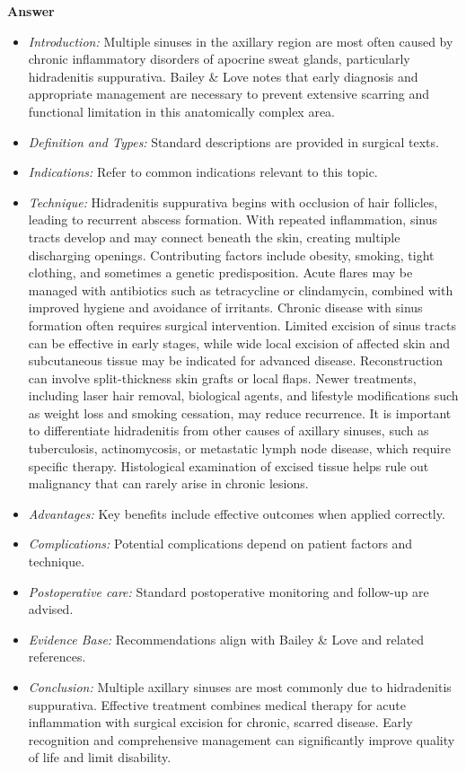 \documentclass{article}
\begin{document}
\textbf{Answer}
\begin{itemize}

\item \emph{Introduction:} Multiple sinuses in the axillary region are most often caused by chronic inflammatory disorders of apocrine sweat glands, particularly hidradenitis suppurativa. Bailey \& Love notes that early diagnosis and appropriate management are necessary to prevent extensive scarring and functional limitation in this anatomically complex area.
\item \emph{Definition and Types:} Standard descriptions are provided in surgical texts.
\item \emph{Indications:} Refer to common indications relevant to this topic.

\item \emph{Technique:} Hidradenitis suppurativa begins with occlusion of hair follicles, leading to recurrent abscess formation. With repeated inflammation, sinus tracts develop and may connect beneath the skin, creating multiple discharging openings. Contributing factors include obesity, smoking, tight clothing, and sometimes a genetic predisposition. Acute flares may be managed with antibiotics such as tetracycline or clindamycin, combined with improved hygiene and avoidance of irritants. Chronic disease with sinus formation often requires surgical intervention. Limited excision of sinus tracts can be effective in early stages, while wide local excision of affected skin and subcutaneous tissue may be indicated for advanced disease. Reconstruction can involve split-thickness skin grafts or local flaps. Newer treatments, including laser hair removal, biological agents, and lifestyle modifications such as weight loss and smoking cessation, may reduce recurrence. It is important to differentiate hidradenitis from other causes of axillary sinuses, such as tuberculosis, actinomycosis, or metastatic lymph node disease, which require specific therapy. Histological examination of excised tissue helps rule out malignancy that can rarely arise in chronic lesions.
\item \emph{Advantages:} Key benefits include effective outcomes when applied correctly.
\item \emph{Complications:} Potential complications depend on patient factors and technique.
\item \emph{Postoperative care:} Standard postoperative monitoring and follow-up are advised.
\item \emph{Evidence Base:} Recommendations align with Bailey \& Love and related references.

\item \emph{Conclusion:} Multiple axillary sinuses are most commonly due to hidradenitis suppurativa. Effective treatment combines medical therapy for acute inflammation with surgical excision for chronic, scarred disease. Early recognition and comprehensive management can significantly improve quality of life and limit disability.


\end{itemize}
\end{document}
